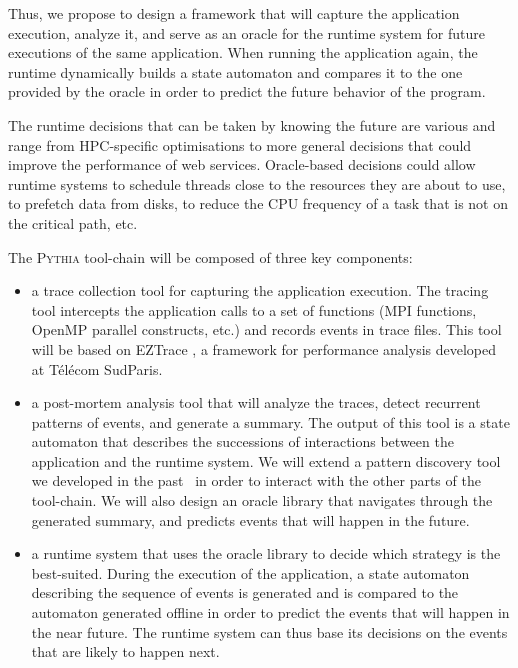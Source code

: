 \documentclass[a4paper,11pt,defblank]{article}
\newcommand{\pname}{\textsc{Pythia}\xspace}
\begin{document}
Thus, we propose to design a framework
that will capture the application execution, analyze it, and serve as
an oracle for the runtime system for future executions of the same
application. When running the application again, the runtime
dynamically builds a state automaton and compares it to the one
provided by the oracle in order to predict the future behavior of the
program.

The runtime decisions that can be taken by knowing the future are
various and range from HPC-specific optimisations to more general
decisions that could improve the performance of web
services. Oracle-based decisions could allow runtime systems to
schedule threads close to the resources they are about to use, to
prefetch data from disks, to reduce the CPU frequency of a task that
is not on the critical path, etc.

The \pname tool-chain will be composed of three key components:
\begin{itemize}
\item a trace collection tool for capturing the application
  execution. The tracing tool intercepts the application calls to a
  set of functions (MPI functions, OpenMP parallel constructs, etc.)
  and records events in trace files. This tool will be based on EZTrace
  \cite{eztrace}, a framework for performance analysis developed at
  Télécom SudParis.

\item a post-mortem analysis tool that will analyze the traces, detect
  recurrent patterns of events, and generate a summary. The output of
  this tool is a state automaton that describes the successions of
  interactions between the application and the runtime system.  We
  will extend a pattern discovery tool we developed in the
  past~\cite{eztrace_pdp} in order to interact with the other parts of
  the tool-chain. We will also design an oracle library that navigates
  through the generated summary, and predicts events that will happen
  in the future.

\item a runtime system that uses the oracle library to decide which
  strategy is the best-suited. During the execution of the
  application, a state automaton describing the sequence of events is
  generated and is compared to the automaton generated offline in
  order to predict the events that will happen in the near future. The
  runtime system can thus base its decisions on the events that are
  likely to happen next.
\end{itemize}
\end{document}
